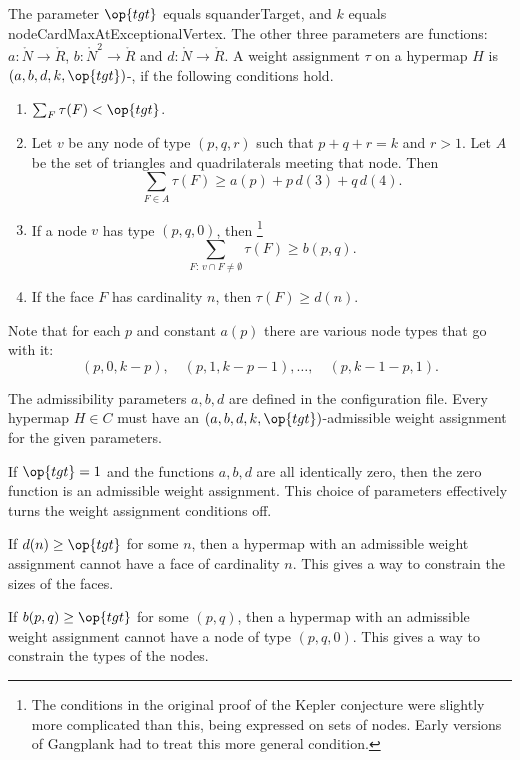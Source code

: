 The parameter $\op{tgt}$ equals squanderTarget, and $k$ equals 
nodeCardMaxAtExceptionalVertex.  The other three parameters are functions:
$a:\ring{N}\to\ring{R}$, $b:\ring{N}^2\to \ring{R}$ and $d:\ring{N}\to\ring{R}$.
A weight assignment $\tau$ on a hypermap $H$
is $(a,b,d,k,\op{tgt})$-, if the following
conditions hold.
\begin{enumerate}
\item {} $\sum_F \tau(F) < \op{tgt}$.
\item {} 
Let $v$ be any node of type $(p,q,r)$ such that $p+q+r=k$ and $r>1$. Let
  $A$ be the set of triangles and quadrilaterals meeting that node.  Then
\[ \sum_{F\in A} \tau(F)
\ge  a(p) + p\, d(3) + q\, d(4).\] 
\item {}
 If a node $v$ has type $(p,q,0)$, then%
\footnote{The conditions in the original proof of the Kepler conjecture were slightly
more complicated than this, being expressed on  sets of nodes.  Early versions of Gangplank had to treat this more general condition.}
  \[ \sum_{F:\,v\cap F\ne\emptyset} \tau(F) \ge
    b(p,q).\] 
\item {}
 If the face $F$ has cardinality $n$, then
$\tau(F) \ge d(n)$.
\end{enumerate}
Note that for each $p$ and constant $a(p)$ there are various node types that go with it:
\[
(p,0,k-p),\quad (p,1,k-p-1),\ldots,\quad (p,k-1-p,1).
\]


The admissibility parameters $a,b,d$ are defined in the configuration
file.  Every hypermap $H\in C$ must have an
$(a,b,d,k,\op{tgt})$-admissible weight assignment for the
given parameters.

\begin{example}  If $\op{tgt}=1$ and the functions $a,b,d$ are all identically zero,
then the zero function is an admissible weight assignment.  This choice of parameters
effectively 
turns the weight assignment conditions off.
\end{example}

\begin{example} If  $d(n)\ge\op{tgt}$ for some $n$, then a hypermap with
an admissible weight assignment cannot have a face of cardinality $n$.  This gives
a way to constrain the sizes of the faces.
\end{example}

\begin{example} If $b(p,q)\ge\op{tgt}$ for some $(p,q)$, then a hypermap with
an admissible weight assignment cannot have a node of type $(p,q,0)$.  This gives
a way to constrain the types of the nodes.
\end{example}


